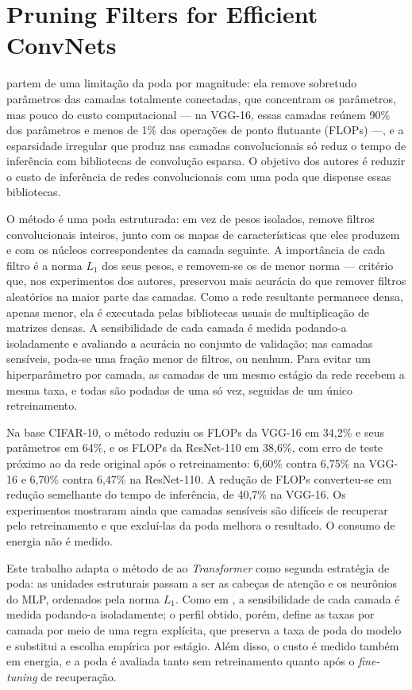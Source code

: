 \section{Pruning Filters for Efficient ConvNets}\label{sec:li2017}

 partem de uma limitação da poda por magnitude: ela remove sobretudo
parâmetros das camadas totalmente conectadas, que concentram os parâmetros, mas pouco do
custo computacional --- na VGG-16, essas camadas reúnem 90\% dos parâmetros e menos de 1\%
das operações de ponto flutuante (FLOPs) ---, e a esparsidade irregular que produz nas
camadas convolucionais só reduz o tempo de inferência com bibliotecas de convolução
esparsa. O objetivo dos autores é reduzir o custo de inferência de redes convolucionais com
uma poda que dispense essas bibliotecas.

O método é uma poda estruturada: em vez de pesos isolados, remove filtros convolucionais
inteiros, junto com os mapas de características que eles produzem e com os núcleos
correspondentes da camada seguinte. A importância de cada filtro é a norma $L_1$ dos seus
pesos, e removem-se os de menor norma --- critério que, nos experimentos dos autores,
preservou mais acurácia do que remover filtros aleatórios na maior parte das camadas. Como
a rede resultante permanece densa, apenas menor, ela é executada pelas bibliotecas usuais
de multiplicação de matrizes densas. A sensibilidade de cada camada é medida podando-a
isoladamente e avaliando a acurácia no conjunto de validação; nas camadas sensíveis,
poda-se uma fração menor de filtros, ou nenhum. Para evitar um hiperparâmetro por camada,
as camadas de um mesmo estágio da rede recebem a mesma taxa, e todas são podadas de uma só
vez, seguidas de um único retreinamento.

Na base CIFAR-10, o método reduziu os FLOPs da VGG-16 em 34,2\% e seus parâmetros em 64\%,
e os FLOPs da ResNet-110 em 38,6\%, com erro de teste próximo ao da rede original após o
retreinamento: 6,60\% contra 6,75\% na VGG-16 e 6,70\% contra 6,47\% na ResNet-110. A
redução de FLOPs converteu-se em redução semelhante do tempo de inferência, de 40,7\% na
VGG-16. Os experimentos mostraram ainda que camadas sensíveis são difíceis de recuperar pelo
retreinamento e que excluí-las da poda melhora o resultado. O consumo de energia não é
medido.

Este trabalho adapta o método de  ao \textit{Transformer} como segunda
estratégia de poda: as unidades estruturais passam a ser as cabeças de atenção e os
neurônios do MLP, ordenados pela norma $L_1$. Como
em , a sensibilidade de cada camada é medida podando-a isoladamente; o
perfil obtido, porém, define as taxas por camada por meio de uma regra explícita, que
preserva a taxa de poda do modelo e substitui a escolha empírica por estágio. Além disso, o
custo é medido também em energia, e a poda é avaliada tanto sem retreinamento quanto após
o \textit{fine-tuning} de recuperação.

